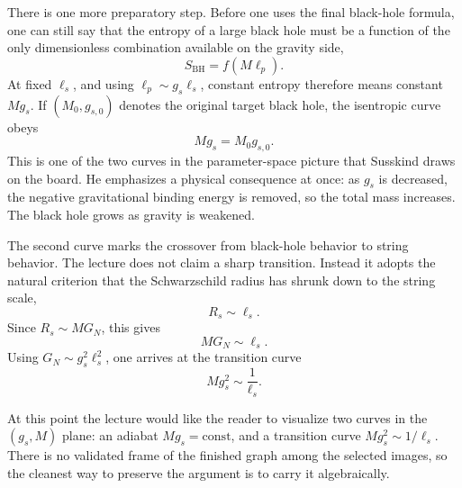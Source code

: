 There is one more preparatory step. Before one uses the final black-hole formula, one can still say that the entropy of a large black hole must be a function of the only dimensionless combination available on the gravity side,
\begin{equation}
S_{\mathrm{BH}} = f(M\ell_p).
\end{equation}
At fixed \(\ell_s\), and using \(\ell_p \sim g_s\ell_s\), constant entropy therefore means constant \(Mg_s\). If \((M_0,g_{s,0})\) denotes the original target black hole, the isentropic curve obeys
\begin{equation}
Mg_s = M_0 g_{s,0}.
\end{equation}
This is one of the two curves in the parameter-space picture that Susskind draws on the board. He emphasizes a physical consequence at once: as \(g_s\) is decreased, the negative gravitational binding energy is removed, so the total mass increases. The black hole grows as gravity is weakened.

The second curve marks the crossover from black-hole behavior to string behavior. The lecture does not claim a sharp transition. Instead it adopts the natural criterion that the Schwarzschild radius has shrunk down to the string scale,
\begin{equation}
R_s \sim \ell_s.
\end{equation}
Since \(R_s \sim MG_N\), this gives
\begin{equation}
MG_N \sim \ell_s.
\end{equation}
Using \(G_N \sim g_s^2\ell_s^2\), one arrives at the transition curve
\begin{equation}
Mg_s^2 \sim \frac{1}{\ell_s}.
\end{equation}

At this point the lecture would like the reader to visualize two curves in the \((g_s,M)\) plane: an adiabat \(Mg_s=\text{const}\), and a transition curve \(Mg_s^2\sim 1/\ell_s\). There is no validated frame of the finished graph among the selected images, so the cleanest way to preserve the argument is to carry it algebraically.

